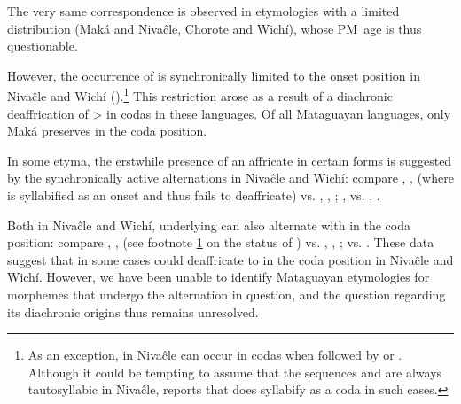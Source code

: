 The very same correspondence is observed in etymologies with a limited distribution (Maká and Nivaĉle, Chorote and Wichí), whose PM~age is thus questionable.

\begin{exe}
    \ex \spillmn
    \ex \grandchildmpl
    \ex \chaguark
    \ex \willow
    \ex \majan
    \ex \limpkin
    \ex \smoke
    \ex \tsaqaq
    \ex \spillcw
    \ex \silkfloss
    \ex \redbrocket
    \ex \eel
\end{exe}

However, the occurrence of  is synchronically limited to the onset position in Nivaĉle \citep[45]{AnG15} and Wichí (\cites[15]{KC94}[42]{JT09-th}[50]{VN14}).\footnote{As an exception, in Nivaĉle  can occur in codas when followed by  or . Although it could be tempting to assume that the sequences  and  are always tautosyllabic in Nivaĉle, \citet{AnG15} reports that  does syllabify as a coda in such cases.\label{tsx-heterosyllabic}} This restriction arose as a result of a diachronic deaffrication of  >  in codas in these languages. Of all Mataguayan languages, only Maká preserves  in the coda position.

\begin{exe}
    \ex \sisinlaw
    \ex \rootn
    \ex \dew
    \ex \offspring
    \ex \basetrunk
    \ex \trunk
    \ex \plits
    \ex \starn
    \ex \gutscw
    \ex \knee
    \ex \wildpepper
\end{exe}

In some etyma, the erstwhile presence of an affricate in certain forms is suggested by the synchronically active alternations in Nivaĉle and Wichí: compare , ,  (where  is syllabified as an onset and thus fails to deaffricate) vs. , , ; ,  vs. , .

Both in Nivaĉle and Wichí, underlying  can also alternate with  in the coda position: compare , ,  (see footnote \ref{tsx-heterosyllabic} on the status of ) vs. , ,  \citep[50]{LC20};  vs.  \citep[200]{VN14}. These data suggest that in some cases  could deaffricate to  in the coda position in Nivaĉle and Wichí. However, we have been unable to identify Mataguayan etymologies for morphemes that undergo the alternation in question, and the question regarding its diachronic origins thus remains unresolved.

